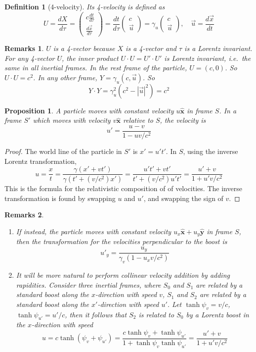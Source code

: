 \documentclass[a4paper]{article}
\newtheorem{remarks}{Remarks}[section]
\theoremstyle{new}
\newtheorem{defi}{Definition}[section]
\newtheorem{prop}{Proposition}[section]
\begin{document}
\begin{defi}[4-velocity]
Its 4-velocity is defined as
\begin{equation}
U = \frac{d X}{d \tau} =
    \begin{pmatrix}
      c\frac{d t}{d \tau}\\
      \frac{d \vec{x}}{d \tau}
    \end{pmatrix}
    = \frac{d t}{d \tau}
    \begin{pmatrix}
      c\\
      \vec{u}
    \end{pmatrix} = \gamma_u
    \begin{pmatrix}
      c\\
      \vec{u}
    \end{pmatrix},\quad\vec{u} = \frac{d \vec{x}}{d t}\label{4-vel}
\end{equation}
\end{defi}
\begin{remarks}
$U$ is a 4-vector because $X$ is a 4-vector and $\tau$ is a Lorentz invariant. For any 4-vector $U$, the inner product $U\cdot U = U' \cdot U'$ is Lorentz invariant, i.e.\ the same in all inertial frames. In the rest frame of the particle, $U = (c, 0)$. So $U\cdot U = c^2$. In any other frame, $Y = \gamma_u(c, \vec{u})$. So
$$ Y\cdot Y = \gamma_u^2 (c^2 - |\vec{u}|^2) = c^2$$
\end{remarks}
\begin{prop}
A particle moves with constant velocity $u\mathbf{\hat{x}}$ in frame $S$. In a frame $S'$ which moves with velocity $v\mathbf{\hat{x}}$ relative to $S$, the velocity is
$$u'=\frac{u-v}{1-uv/c^2}$$
\end{prop}
\begin{proof}
The world line of the particle in $S'$ is $x'=u't'$. In $S$, using the inverse Lorentz transformation,
$$u = \frac{x}{t} = \frac{\gamma(x' + vt')}{\gamma(t' + (v/c^2) x')} = \frac{u't' + vt'}{t' + (v/c^2)u't'} = \frac{u' + v}{1 + u'v/c^2}$$
This is the formula for the relativistic composition of of velocities. The inverse transformation is found by swapping $u$ and $u'$, and swapping the sign of $v$.
\end{proof}
\begin{remarks}\leavevmode
\begin{enumerate}
\item If instead, the particle moves with constant velocity $u_x\mathbf{\hat{x}}+u_y\mathbf{\hat{y}}$ in frame $S$, then the transformation for the velocities perpendicular to the boost is
$$u'_y=\frac{u_y}{\gamma_v(1-u_xv/c^2)}$$
\item It will be more natural to perform collinear velocity addition by adding rapidities. Consider three inertial frames, where $S_0$ and $S_1$ are related by a standard boost along the $x$-direction with speed $v$, $S_1$ and $S_2$ are related by a standard boost along the $x'$-direction with speed $u'$. Let $\tanh\psi_v=v/c$, $\tanh\psi_{u'}=u'/c$, then it follows that $S_2$ is related to $S_0$ by a Lorentz boost in the $x$-direction with speed 
$$u=c\tanh(\psi_v+\psi_{u'})=\frac{c\tanh\psi_v+\tanh\psi_{u'}}{1+\tanh\psi_v\tanh\psi_{u'}}=\frac{u'+v}{1+u'v/c^2}$$
\end{enumerate}
\end{remarks}
\end{document}
